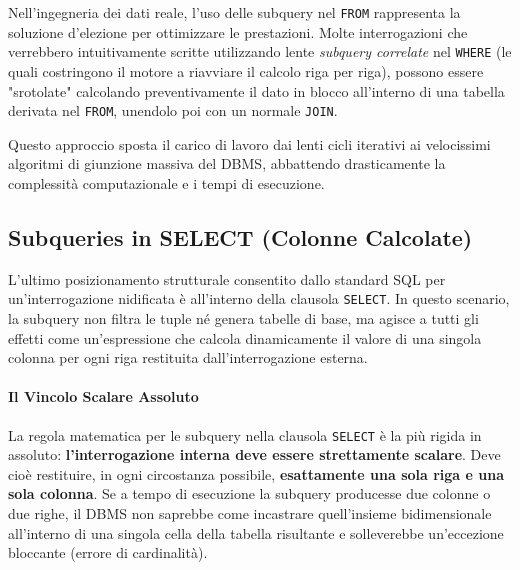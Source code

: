 \begin{bestpractice}
Nell'ingegneria dei dati reale, l'uso delle subquery nel \texttt{FROM} rappresenta la soluzione d'elezione per ottimizzare le prestazioni. Molte interrogazioni che verrebbero intuitivamente scritte utilizzando lente \textit{subquery correlate} nel \texttt{WHERE} (le quali costringono il motore a riavviare il calcolo riga per riga), possono essere "srotolate" calcolando preventivamente il dato in blocco all'interno di una tabella derivata nel \texttt{FROM}, unendolo poi con un normale \texttt{JOIN}. 

Questo approccio sposta il carico di lavoro dai lenti cicli iterativi ai velocissimi algoritmi di giunzione massiva del DBMS, abbattendo drasticamente la complessità computazionale e i tempi di esecuzione.
\end{bestpractice}

\subsection{Subqueries in SELECT (Colonne Calcolate)}

L'ultimo posizionamento strutturale consentito dallo standard SQL per un'interrogazione nidificata è all'interno della clausola \texttt{SELECT}. In questo scenario, la subquery non filtra le tuple né genera tabelle di base, ma agisce a tutti gli effetti come un'espressione che calcola dinamicamente il valore di una singola colonna per ogni riga restituita dall'interrogazione esterna.

\paragraph{Il Vincolo Scalare Assoluto}
La regola matematica per le subquery nella clausola \texttt{SELECT} è la più rigida in assoluto: \textbf{l'interrogazione interna deve essere strettamente scalare}. Deve cioè restituire, in ogni circostanza possibile, \textbf{esattamente una sola riga e una sola colonna}. Se a tempo di esecuzione la subquery producesse due colonne o due righe, il DBMS non saprebbe come incastrare quell'insieme bidimensionale all'interno di una singola cella della tabella risultante e solleverebbe un'eccezione bloccante (errore di cardinalità).

